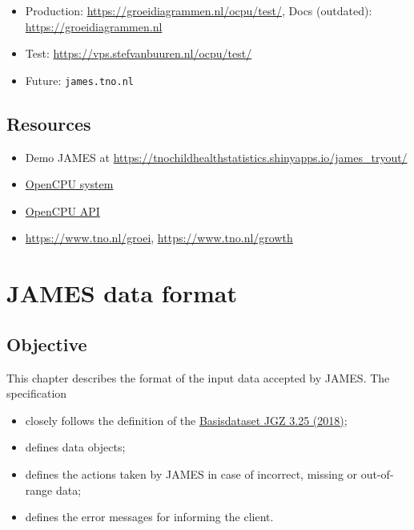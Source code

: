 \documentclass[
]{book}
\providecommand{\tightlist}{%
  \setlength{\itemsep}{0pt}\setlength{\parskip}{0pt}}
\begin{document}
\begin{itemize}
\tightlist
\item
  Production: \url{https://groeidiagrammen.nl/ocpu/test/}, Docs (outdated): \url{https://groeidiagrammen.nl}
\item
  Test: \url{https://vps.stefvanbuuren.nl/ocpu/test/}
\item
  Future: \texttt{james.tno.nl}
\end{itemize}

\hypertarget{resources}{%
\section{Resources}\label{resources}}

\begin{itemize}
\tightlist
\item
  Demo JAMES at \url{https://tnochildhealthstatistics.shinyapps.io/james_tryout/}
\item
  \href{https://www.opencpu.org}{OpenCPU system}
\item
  \href{https://www.opencpu.org/api.html}{OpenCPU API}
\item
  \url{https://www.tno.nl/groei}, \url{https://www.tno.nl/growth}
\end{itemize}

\hypertarget{james-data-format}{%
\chapter{JAMES data format}\label{james-data-format}}

\hypertarget{objective}{%
\section{Objective}\label{objective}}

This chapter describes the format of the input data accepted by JAMES. The specification

\begin{itemize}
\tightlist
\item
  closely follows the definition of the \href{https://www.ncj.nl/themadossiers/informatisering/basisdataset/}{Basisdataset JGZ 3.25 (2018)};
\item
  defines data objects;
\item
  defines the actions taken by JAMES in case of incorrect, missing or out-of-range data;
\item
  defines the error messages for informing the client.
\end{itemize}
\end{document}
